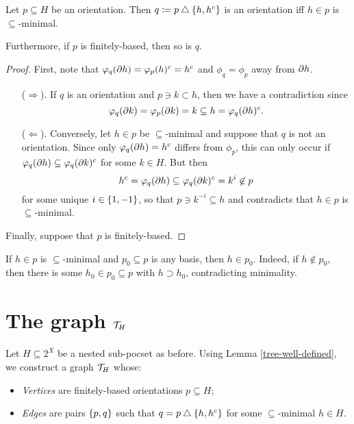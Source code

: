 \documentclass{amsart}
\begin{document}
    \begin{lemma}\label{tree-well-defined}
        Let $p\subseteq H$ be an orientation. Then $q\coloneqq p\bigtriangleup\left\{h,h^c\right\}$ is an orientation iff $h\in p$ is $\subseteq$-minimal.

        Furthermore, if $p$ is finitely-based, then so is $q$.
    \end{lemma}
    \begin{proof}
        First, note that $\varphi_q(\partial h)=\varphi_p(h)^c=h^c$ and $\phi_q=\phi_p$ away from $\partial h$.
        \begin{itemize}
            \item[($\Rightarrow$).] If $q$ is an orientation and $p\ni k\subset h$, then we have a contradiction since
                \begin{equation*}
                    \varphi_q(\partial k)=\varphi_p(\partial k)=k\subseteq h=\varphi_q(\partial h)^c.
                \end{equation*}
            \item[($\Leftarrow$).]Conversely, let $h\in p$ be $\subseteq$-minimal and suppose that $q$ is not an orientation. Since only $\varphi_q(\partial h)=h^c$ differs from $\phi_p$, this can only occur if $\varphi_q(\partial h)\subseteq\varphi_q(\partial k)^c$ for some $k\in H$. But then
                \begin{equation*}
                    h^c=\varphi_q(\partial h)\subseteq\varphi_q(\partial k)^c=k^i\not\in p
                \end{equation*}
                for some unique $i\in\left\{1,-1\right\}$, so that $p\ni k^{-i}\subseteq h$ and contradicts that $h\in p$ is $\subseteq$-minimal.
        \end{itemize}
        Finally, suppose that $p$ is finitely-based. {\color{red}{???}}
    \end{proof}

    \begin{remark}
        If $h\in p$ is $\subseteq$-minimal and $p_0\subseteq p$ is any basis, then $h\in p_0$. Indeed, if $h\not\in p_0$, then there is some $h_0\in p_0\subseteq p$ with $h\supset h_0$, contradicting minimality.
    \end{remark}

    \section{The graph $\mathcal{T}_H$}

    Let $H\subseteq2^X$ be a nested sub-pocset as before. Using Lemma \ref{tree-well-defined}, we construct a graph $\mathcal{T}_H$ whose:
    \begin{itemize}
        \item \textit{Vertices} are finitely-based orientations $p\subseteq H$;
        \item \textit{Edges} are pairs $\left\{p,q\right\}$ such that $q=p\bigtriangleup\left\{h,h^c\right\}$ for some $\subseteq$-minimal $h\in H$.
    \end{itemize}
\end{document}
